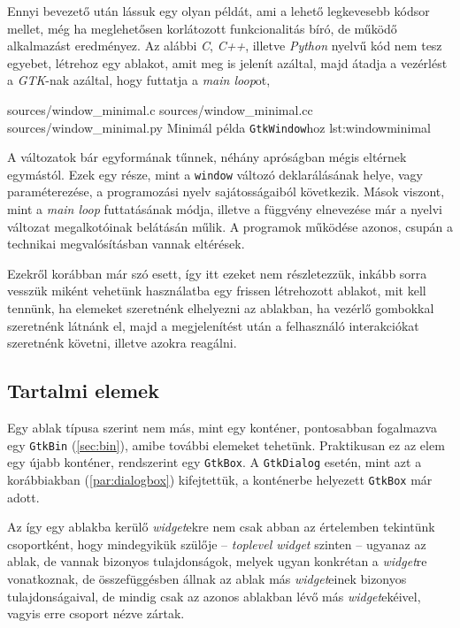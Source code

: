 Ennyi bevezető után lássuk egy olyan példát, ami a lehető legkevesebb kódsor mellet, még ha meglehetősen korlátozott funkcionalitás bíró, de működő alkalmazást eredményez. Az alábbi \textit{C}, \textit{C++}, illetve \textit{Python} nyelvű kód nem tesz egyebet, létrehoz egy ablakot, amit meg is jelenít azáltal, majd átadja a vezérlést a \textit{GTK}-nak azáltal, hogy futtatja a \textit{main loop}ot, 

\lsttriplesource
{sources/window_minimal.c}
{sources/window_minimal.cc}
{sources/window_minimal.py}
{Minimál példa \texttt{GtkWindow}hoz}
{lst:windowminimal}

A változatok bár egyformának tűnnek, néhány apróságban mégis eltérnek egymástól. Ezek egy része, mint a \texttt{window} változó deklarálásának helye, vagy paraméterezése, a programozási nyelv sajátosságaiból következik. Mások viszont, mint a \textit{main loop} futtatásának módja, illetve a függvény elnevezése már a nyelvi változat megalkotóinak belátásán műlik. A programok működése azonos, csupán a technikai megvalósításban vannak eltérések.

Ezekről korábban már szó esett, így itt ezeket nem részletezzük, inkább sorra vesszük miként vehetünk használatba egy frissen létrehozott ablakot, mit kell tennünk, ha elemeket szeretnénk elhelyezni az ablakban, ha vezérlő gombokkal szeretnénk látnánk el, majd a megjelenítést után a felhasználó interakciókat szeretnénk követni, illetve azokra reagálni.

\subsection{Tartalmi elemek}

Egy ablak típusa szerint nem más, mint egy konténer, pontosabban fogalmazva egy \texttt{GtkBin} (\ref{sec:bin}), amibe további elemeket tehetünk. Praktikusan ez az elem egy újabb konténer, rendszerint egy \texttt{GtkBox}. A \texttt{GtkDialog} esetén, mint azt a korábbiakban (\ref{par:dialogbox}) kifejtettük, a konténerbe helyezett \texttt{GtkBox} már adott.

Az így egy ablakba kerülő \textit{widget}ekre nem csak abban az értelemben tekintünk csoportként, hogy mindegyikük szülője -- \textit{toplevel widget} szinten -- ugyanaz az ablak, de vannak bizonyos tulajdonságok, melyek ugyan konkrétan a \textit{widget}re vonatkoznak, de összefüggésben állnak az ablak más \textit{widget}einek bizonyos tulajdonságaival, de mindig csak az azonos ablakban lévő más \textit{widget}ekéivel, vagyis erre csoport nézve zártak.

